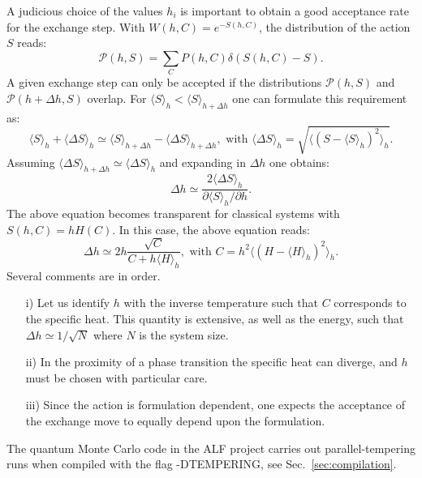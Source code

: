 A judicious choice of the values $h_i$ is important to obtain a good acceptance rate for the exchange step.  With  $W(h,C)  = e^{- S(h,C) }$, the  distribution of the action $S$  reads:
\begin{equation}
	 \mathcal{P}( h, S ) =   \sum_{C}     P( h,C )   \delta ( S(h,C) -  S ). 
\end{equation}
A given exchange step can only be accepted if the distributions $\mathcal{P}(h,S)$ and $\mathcal{P}(h+\Delta h, S)$ overlap. For 
$\langle S \rangle_{h}  < \langle S \rangle_{h +  \Delta h} $   one can formulate this  requirement as:
\begin{equation}
	\langle S \rangle_{h}  +\langle \Delta S \rangle_{h}   \simeq \langle S \rangle_{h +  \Delta h}  - \langle \Delta S \rangle_{h + \Delta h} ,  \text{    with   }   
\langle \Delta S \rangle_{h}   =  \sqrt{ \langle \left(    S -  \langle S   \rangle_h  	\right)^2 \rangle_h} .
\end{equation}
Assuming  $ \langle \Delta S \rangle_{h + \Delta h}  \simeq \langle \Delta S \rangle_{h} $  and expanding in $\Delta h$ one obtains: 
\begin{equation}
	\Delta h \simeq \frac{ 2  \langle \Delta S \rangle_{h}    }{ \partial \langle S \rangle_{h} / \partial h}.  
\end{equation} 
The above equation becomes transparent  for  classical systems  with $ S(h,C) =  h H(C) $.  In this case, the above equation reads: 
\begin{equation}
	\Delta h       \simeq  2 h \frac{  \sqrt{C} } { C    + h \langle H \rangle_h},  \text{   with  } C = h^2    \langle \left(  H -  \langle H   \rangle_h \right)^2 \rangle_h .
\end{equation} 
Several comments are in order.
\begin{itemize}
\item[i)] Let us identify $h$ with the inverse temperature  such that $C$ corresponds to the specific heat. This quantity is extensive,  as well as the energy, such that $ \Delta h \simeq 1/{\sqrt{N}} $ where $N$ is the system size.
\item[ii)] In the proximity of a phase transition the specific heat can diverge, and $h$ must be chosen with particular care.
\item[iii)]  Since the action is formulation dependent, one expects the acceptance of the  exchange move to equally depend  upon the formulation. 
\end{itemize}
The quantum Monte Carlo code in the ALF project carries out parallel-tempering runs when compiled with the flag -DTEMPERING, see Sec.~\ref{sec:compilation}.
